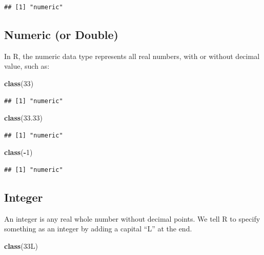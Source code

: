 \documentclass[
]{book}
\newenvironment{Shaded}{\begin{snugshade}}{\end{snugshade}}
\newcommand{\DataTypeTok}[1]{\textcolor[rgb]{0.13,0.29,0.53}{#1}}
\newcommand{\DecValTok}[1]{\textcolor[rgb]{0.00,0.00,0.81}{#1}}
\newcommand{\FloatTok}[1]{\textcolor[rgb]{0.00,0.00,0.81}{#1}}
\newcommand{\FunctionTok}[1]{\textcolor[rgb]{0.13,0.29,0.53}{\textbf{#1}}}
\newcommand{\NormalTok}[1]{#1}
\newcommand{\SpecialCharTok}[1]{\textcolor[rgb]{0.81,0.36,0.00}{\textbf{#1}}}
\begin{document}
\begin{verbatim}
## [1] "numeric"
\end{verbatim}

\subsection{Numeric (or Double)}\label{numeric-or-double}

In R, the numeric data type represents all real numbers, with or without decimal value, such as:

\begin{Shaded}
\begin{Highlighting}[]
\FunctionTok{class}\NormalTok{(}\DecValTok{33}\NormalTok{)}
\end{Highlighting}
\end{Shaded}

\begin{verbatim}
## [1] "numeric"
\end{verbatim}

\begin{Shaded}
\begin{Highlighting}[]
\FunctionTok{class}\NormalTok{(}\FloatTok{33.33}\NormalTok{)}
\end{Highlighting}
\end{Shaded}

\begin{verbatim}
## [1] "numeric"
\end{verbatim}

\begin{Shaded}
\begin{Highlighting}[]
\FunctionTok{class}\NormalTok{(}\SpecialCharTok{{-}}\DecValTok{1}\NormalTok{)}
\end{Highlighting}
\end{Shaded}

\begin{verbatim}
## [1] "numeric"
\end{verbatim}

\subsection{Integer}\label{integer}

An integer is any real whole number without decimal points. We tell R to specify something as an integer by adding a capital ``L'' at the end.

\begin{Shaded}
\begin{Highlighting}[]
\FunctionTok{class}\NormalTok{(}\DecValTok{33}\DataTypeTok{L}\NormalTok{)}
\end{Highlighting}
\end{Shaded}
\end{document}
